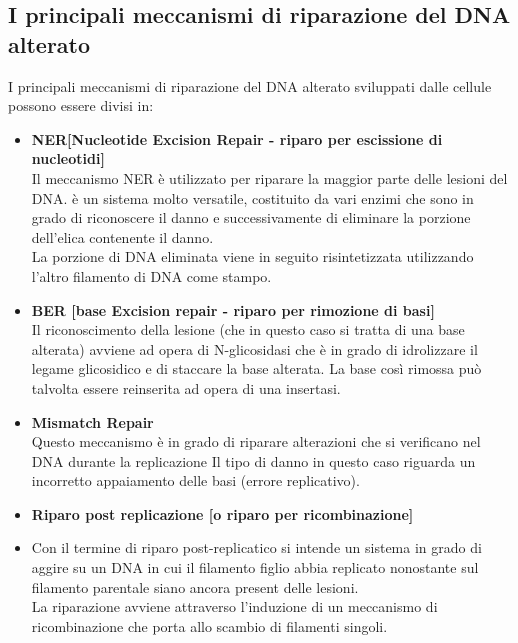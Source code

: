 \documentclass{article}
\begin{document}
\subsection{I principali meccanismi di riparazione del DNA alterato}
I principali meccanismi di riparazione del DNA alterato sviluppati dalle cellule possono essere divisi in:
\begin{itemize}
    \item \textbf{NER[Nucleotide Excision Repair - riparo per escissione di nucleotidi]}\\
    Il meccanismo NER è utilizzato per riparare la maggior parte delle lesioni del DNA. è un sistema molto versatile, costituito da vari enzimi che sono in grado di riconoscere il danno e successivamente di eliminare la porzione dell'elica contenente il danno.\\
    La porzione di DNA eliminata viene in seguito risintetizzata utilizzando l'altro filamento di DNA come stampo.
    \item \textbf{BER [base Excision repair - riparo per rimozione di basi]}\\
    Il riconoscimento della lesione (che in questo caso si tratta di una base alterata) avviene ad opera di N-glicosidasi che è in grado di idrolizzare il legame glicosidico e di staccare la base alterata. La base così rimossa può talvolta essere reinserita ad opera di una insertasi.
    \item \textbf{Mismatch Repair}\\
    Questo meccanismo è in grado di riparare alterazioni che si verificano nel DNA durante la replicazione Il tipo di danno in questo caso riguarda un incorretto appaiamento delle basi (errore replicativo).
    \item \textbf{Riparo post replicazione [o riparo per ricombinazione]}\\
    \item Con il termine di riparo post-replicatico si intende un sistema in grado di aggire su un DNA in cui il filamento figlio abbia replicato nonostante sul filamento parentale siano ancora present delle lesioni.\\
    La riparazione avviene attraverso l'induzione di un meccanismo di ricombinazione che porta allo scambio di filamenti singoli.
\end{itemize}
\end{document}

